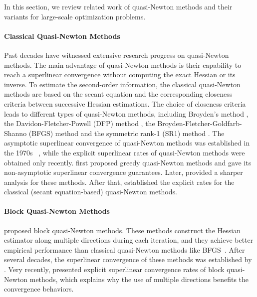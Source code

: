 \documentclass[letterpaper]{article} %
\theoremstyle{plain}
\theoremstyle{definition}
\theoremstyle{remark}
\begin{document}
In this section, we review related work of quasi-Newton methods and their variants for large-scale optimization problems.

\paragraph{Classical Quasi-Newton Methods} 
Past decades have witnessed extensive research progress on quasi-Newton methods. 
The main advantage of quasi-Newton methods is their capability to reach a superlinear convergence without computing the exact Hessian or its inverse. 
To estimate the second-order information, the classical quasi-Newton methods are based on the secant equation and the corresponding closeness criteria between successive Hessian estimations. 
The choice of closeness criteria leads to different types of quasi-Newton methods, including Broyden's method \cite{broyden1965class,broyden1973local,gay1979some}, the Davidon-Fletcher-Powell (DFP) method \cite{davidon1991variable,fletcher1963rapidly}, the Broyden-Fletcher-Goldfarb-Shanno (BFGS) method \cite{broyden1970convergence, fletcher1970new,goldfarb1970family,shanno1970conditioning} and the symmetric rank-1 (SR1) method \cite{conn1991convergence}. %
The asymptotic superlinear convergence of quasi-Newton methods was established in the 1970s~ \cite{powell1971convergence,dixon1972quasi,dixon1972quasi_2, broyden1973local,dennis1974characterization}, 
while the explicit superlinear rates of quasi-Newton methods were obtained only recently. 
\citet{rodomanov2021greedy} first proposed greedy quasi-Newton methods and gave its non-asymptotic superlinear convergence guarantees. 
Later, \citet{lin2022explicit} provided a sharper analysis for these methods. 
After that, \citet{rodomanov2021new,rodomanov2021rates,jin2023non,ye2021explicit} established the explicit rates for the classical (secant equation-based) quasi-Newton methods.

\paragraph{Block Quasi-Newton Methods} 
\citet{schnabel1983quasi} proposed block quasi-Newton methods. These methods construct the Hessian estimator along multiple directions during each iteration, and they achieve better empirical performance than classical quasi-Newton methods like BFGS~\cite{o1994linear}. 
After several decades, the superlinear convergence of these methods was established by \citet{gao2018block,gower2016stochastic,gower2017randomized}. 
Very recently, \citet{liu2023symmetric} presented explicit superlinear convergence rates of block quasi-Newton methods, which explains why the use of multiple directions benefits the convergence behaviors.
\end{document}

